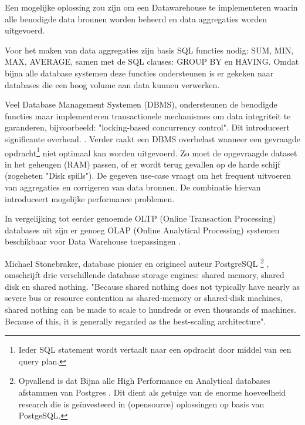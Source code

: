 
Een mogelijke oplossing zou zijn om een Datawarehouse te implementeren waarin alle benodigde data bronnen worden beheerd en data aggregaties worden uitgevoerd. 

Voor het maken van data aggregaties zijn basis SQL functies nodig: SUM, MIN, MAX, AVERAGE, samen met de SQL clauses: GROUP BY en HAVING. \parencite{data-mining}
Omdat bijna alle database systemen deze functies ondersteunen is er gekeken naar databases die een hoog volume aan data kunnen verwerken. 

Veel Database Management Systemen (DBMS), ondersteunen de benodigde functies maar implementeren transactionele mechanismes om data integriteit te garanderen, bijvoorbeeld: "locking-based concurrency control". Dit introduceert significante overhead. \parencite{harizopoulos2008oltp}. Verder raakt een DBMS overbelast wanneer een gevraagde opdracht\footnote{ Ieder SQL statement wordt vertaalt naar een opdracht door middel van een query plan.} niet optimaal kan worden uitgevoerd. Zo moet de opgevraagde dataset in het geheugen (RAM) passen, of er wordt terug gevallen op de harde schijf (zogeheten "Disk spills"). De gegeven use-case vraagt om het frequent uitvoeren van aggregaties en corrigeren van data bronnen. De combinatie hiervan introduceert mogelijke performance problemen. \parencite{kersten2011researcher}


In vergelijking tot eerder genoemde OLTP (Online Transaction Processing) databases uit \textcite{kersten2011researcher} zijn er genoeg OLAP (Online Analytical Processing) systemen beschikbaar voor Data Warehouse toepassingen \parencite{data-mining}.


Michael Stonebraker, database pionier en origineel auteur PostgreSQL
\footnote{
 Opvallend is dat Bijna alle High Performance en Analytical databases afstammen van Postgres \parencite{postgresforks}. Dit dient als getuige van de enorme hoeveelheid research die is geïnvesteerd in (opensource) oplossingen op basis van PostgeSQL.
}
, omschrijft drie verschillende database storage engines: shared memory, shared disk en shared nothing. "Because shared nothing does not typically have nearly as severe bus or resource contention as shared-memory or shared-disk machines, shared nothing can be made to scale to hundreds or even thousands of machines. Because of this, it is generally regarded as the best-scaling architecture". \parencite{dewitt2006build}


